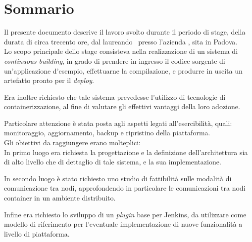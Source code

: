 
\cleardoublepage
{}
{}
\begingroup
\let\clearpage\relax
\let\cleardoublepage\relax
\let\cleardoublepage\relax

\chapter*{Sommario}

Il presente documento descrive il lavoro svolto durante il periodo di stage, della durata di circa trecento ore, dal laureando \myName\ presso l'azienda \myCompany, sita in Padova.\\

Lo scopo principale dello stage consisteva nella realizzazione di un sistema di \textit{\gls{continuous building}}, in grado di prendere in ingresso il codice sorgente di un'applicazione d'esempio, effettuarne la compilazione, e produrre in uscita un \gls{artefatto} pronto per il \textit{\gls{deploy}}.

Era inoltre richiesto che tale sistema prevedesse l'utilizzo di tecnologie di containerizzazione, al fine di valutare gli effettivi vantaggi della loro adozione.

Particolare attenzione è stata posta agli aspetti legati all'esercibilità, quali: monitoraggio, aggiornamento, backup e ripristino della piattaforma.\\

Gli obiettivi da raggiungere erano molteplici:\\
In primo luogo era richiesta la progettazione e la definizione dell'architettura sia di alto livello che di dettaglio di tale sistema, e la sua implementazione.

In secondo luogo è stato richiesto uno studio di fattibilità sulle modalità di comunicazione tra nodi, approfondendo in particolare le comunicazioni tra nodi container in un ambiente distribuito.

Infine era richiesto lo sviluppo di un \textit{\gls{plugin}} base per Jenkins, da utilizzare come modello di riferimento per l'eventuale implementazione di nuove funzionalità a livello di piattaforma.

%
%

\endgroup			

\vfill

